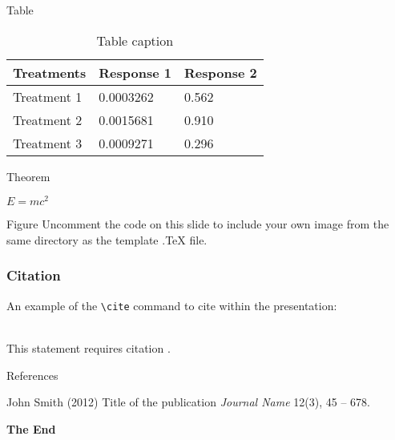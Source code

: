 \documentclass[aspectratio=169,xcolor=dvipsnames]{beamer}
\begin{document}
\begin{frame}{Table}
    \begin{table}
        \begin{tabular}{l l l}
            \toprule
            \textbf{Treatments} & \textbf{Response 1} & \textbf{Response 2} \\
            \midrule
            Treatment 1         & 0.0003262           & 0.562               \\
            Treatment 2         & 0.0015681           & 0.910               \\
            Treatment 3         & 0.0009271           & 0.296               \\
            \bottomrule
        \end{tabular}
        \caption{Table caption}
    \end{table}
\end{frame}


\begin{frame}{Theorem}
    \begin{theorem}
        $E = mc^2$
    \end{theorem}
\end{frame}


\begin{frame}{Figure}
    Uncomment the code on this slide to include your own image from the same directory as the template .TeX file.
\end{frame}


\begin{frame}[fragile] %
    \frametitle{Citation}
    An example of the \verb|\cite| command to cite within the presentation:\\~

    This statement requires citation \cite{p1}.
\end{frame}


\begin{frame}{References}
    \footnotesize{
        \begin{thebibliography}{99}
             John Smith (2012)
            \newblock Title of the publication
            \newblock \emph{Journal Name} 12(3), 45 -- 678.
        \end{thebibliography}
    }
\end{frame}


\begin{frame}
    \Huge{\centerline{\textbf{The End}}}
\end{frame}

\end{document}
